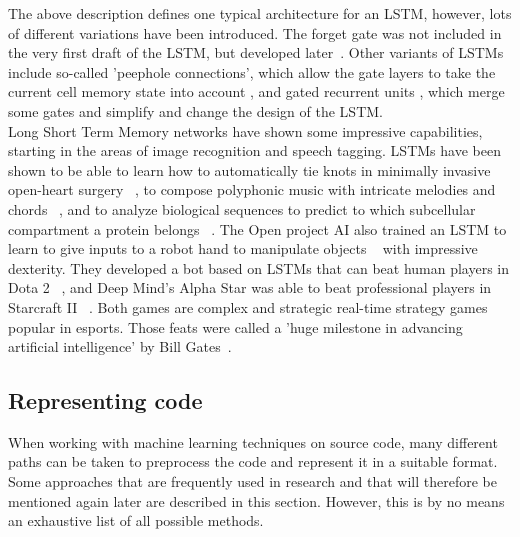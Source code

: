 \documentclass[
	a4paper,
	pagesize,
	pdftex,
	12pt,
	twoside, %
	BCOR=5mm, %
	ngerman,
	fleqn,
	final,
	]{scrartcl}
\begin{document}
The above description defines one typical architecture for an LSTM, however, lots of different variations have been introduced. The forget gate was not included in the very first draft of the LSTM, but developed later~\cite{Gers.1999}. Other variants of LSTMs include so-called 'peephole connections', which allow the gate layers to take the current cell memory state into account \cite{Gers.2000}, and gated recurrent units \cite{Cho.2014}, which merge some gates and simplify and change the design of the LSTM. \\
Long Short Term Memory networks have shown some impressive capabilities, starting in the areas of image recognition and speech tagging. LSTMs have been shown to be able to learn how to automatically tie knots in minimally invasive open-heart surgery ~\cite{Mayer.2008}, to compose polyphonic music with intricate melodies and chords ~\cite{Kumar.2019}, and to analyze biological sequences to predict to which subcellular compartment a protein belongs ~\cite{Snderby.2015}. The Open project AI also trained an LSTM to learn to give inputs to a robot hand to manipulate objects ~\cite{OpenAIBlog.2018} with impressive dexterity. They developed a bot based on LSTMs that can beat human players in Dota 2 ~\cite{Rodriguez.2018}, and Deep Mind's Alpha Star was able to beat professional players in Starcraft II ~\cite{Stanford.2019}. Both games are complex and strategic real-time strategy games popular in esports. Those feats were called a 'huge milestone in advancing artificial intelligence' by Bill Gates~\cite{Gates2019}. 

\subsection{Representing code}

When working with machine learning techniques on source code, many different paths can be taken to preprocess the code and represent it in a suitable format. Some approaches that are frequently used in research and that will therefore be mentioned again later are described in this section. However, this is by no means an exhaustive list of all possible methods. 
\end{document}
